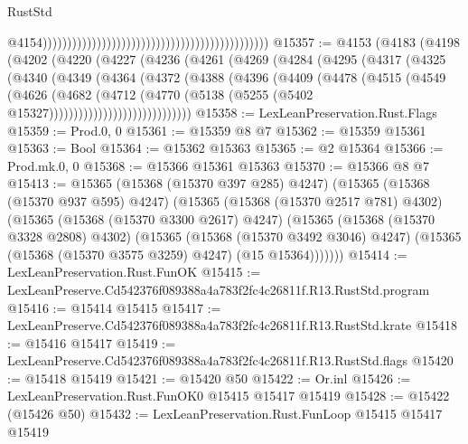 \begin{lexlean}{RustStd}
\begin{coremodule}
                                                                                                @4154))))))))))))))))))))))))))))))))))))))))))))))
@15357 := @4153
    (@4183
      (@4198
        (@4202
          (@4220
            (@4227
              (@4236
                (@4261
                  (@4269
                    (@4284
                      (@4295
                        (@4317
                          (@4325
                            (@4340
                              (@4349
                                (@4364
                                  (@4372
                                    (@4388
                                      (@4396
                                        (@4409
                                          (@4478
                                            (@4515
                                              (@4549
                                                (@4626
                                                  (@4682
                                                    (@4712
                                                      (@4770
                                                        (@5138
                                                          (@5255
                                                            (@5402
                                                              @15327)))))))))))))))))))))))))))))
@15358 := LexLeanPreservation.Rust.Flags
@15359 := Prod.{0, 0}
@15361 := @15359 @8 @7
@15362 := @15359 @15361
@15363 := Bool
@15364 := @15362 @15363
@15365 := @2 @15364
@15366 := Prod.mk.{0, 0}
@15368 := @15366 @15361 @15363
@15370 := @15366 @8 @7
@15413 := @15365
    (@15368 (@15370 @397 @285) @4247)
    (@15365
      (@15368 (@15370 @937 @595) @4247)
      (@15365
        (@15368 (@15370 @2517 @781) @4302)
        (@15365
          (@15368 (@15370 @3300 @2617) @4247)
          (@15365
            (@15368 (@15370 @3328 @2808) @4302)
            (@15365
              (@15368 (@15370 @3492 @3046) @4247)
              (@15365 (@15368 (@15370 @3575 @3259) @4247) (@15 @15364)))))))
@15414 := LexLeanPreservation.Rust.FunOK
@15415 := LexLeanPreserve.Cd542376f089388a4a783f2fc4c26811f.R13.RustStd.program
@15416 := @15414 @15415
@15417 := LexLeanPreserve.Cd542376f089388a4a783f2fc4c26811f.R13.RustStd.krate
@15418 := @15416 @15417
@15419 := LexLeanPreserve.Cd542376f089388a4a783f2fc4c26811f.R13.RustStd.flags
@15420 := @15418 @15419
@15421 := @15420 @50
@15422 := Or.inl
@15426 := LexLeanPreservation.Rust.FunOK0 @15415 @15417 @15419
@15428 := @15422 (@15426 @50)
@15432 := LexLeanPreservation.Rust.FunLoop @15415 @15417 @15419

\end{coremodule}
\end{lexlean}
